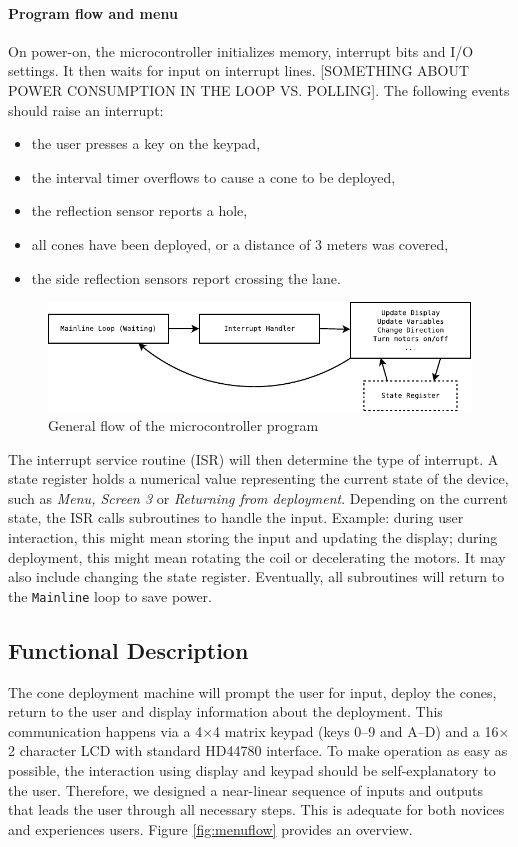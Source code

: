 \documentclass[11pt]{report}
\begin{document}
\paragraph{Program flow and menu}
On power-on, the microcontroller initializes memory, interrupt bits and I/O settings. It then waits for input on interrupt lines. [SOMETHING ABOUT POWER CONSUMPTION IN THE LOOP VS. POLLING]. The following events should raise an interrupt:
\begin{itemize}
  \item{the user presses a key on the keypad,}
  \item{the interval timer overflows to cause a cone to be deployed,}
  \item{the reflection sensor reports a hole,}
  \item{all cones have been deployed, or a distance of 3 meters was covered,}
  \item{the side reflection sensors report crossing the lane.}
\end{itemize}
\begin{figure}
  \centering
  \includegraphics{program_flow.pdf}
  \caption{General flow of the microcontroller program}
  \label{fig:programflow}
\end{figure}
The interrupt service routine (ISR) will then determine the type of interrupt. A state register holds a numerical value representing the current state of the device, such as \textit{Menu, Screen 3} or \textit{Returning from deployment}. Depending on the current state, the ISR calls subroutines to handle the input. Example: during user interaction, this might mean storing the input and updating the display; during deployment, this might mean rotating the coil or decelerating the motors. It may also include changing the state register. Eventually, all subroutines will return to the \texttt{Mainline} loop to save power.

\subsection{Functional Description}
The cone deployment machine will prompt the user for input, deploy the cones, return to the user and display information about the deployment. This communication happens via a 4$\times$4 matrix keypad (keys 0--9 and A--D) and a 16$\times$2 character LCD with standard HD44780 interface. To make operation as easy as possible, the interaction using display and keypad should be self-explanatory to the user. Therefore, we designed a near-linear sequence of inputs and outputs that leads the user through all necessary steps. This is adequate for both novices and experiences users. Figure \ref{fig:menuflow} provides an overview.
\end{document}
